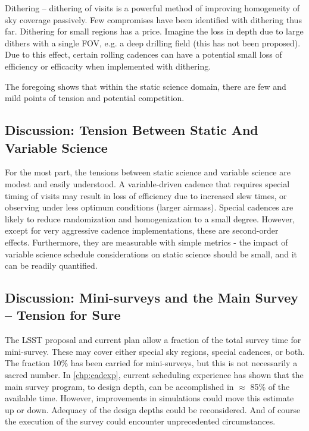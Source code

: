 \begin{description}
\item{Dithering} -- dithering of visits is a powerful method of
improving homogeneity of sky coverage passively. Few compromises have
been identified with dithering thus far.  Dithering for small regions
has a price. Imagine the loss in depth due to large dithers with a
single FOV, e.g. a deep drilling field (this has not been proposed).
Due to this effect, certain rolling cadences can have a potential small
loss of efficiency or efficacity when implemented with dithering.

\end{description}

The foregoing shows that within the static science domain, there are few
and mild points of tension and potential competition.


\subsection{Discussion: Tension Between Static And Variable Science}

For the most part, the tensions between static science and variable
science are modest and easily understood.  A variable-driven cadence
that requires special timing of visits may result in loss of efficiency
due to increased slew times, or observing under less optimum conditions
(larger airmass).  Special cadences are likely to reduce randomization
and homogenization to a small degree. However, except for very
aggressive cadence implementations, these are second-order effects.
Furthermore, they are measurable with simple metrics - the impact of
variable science schedule considerations on static science should be
small, and it can be readily quantified.


\subsection{Discussion: Mini-surveys and the Main Survey -- Tension for Sure}

The LSST proposal and current plan allow a fraction of the total survey
time for mini-survey. These may cover either special sky regions,
special cadences, or both. The fraction 10\% has been carried for
mini-surveys, but this is not necessarily a sacred number. In
\autoref{chp:cadexp}, current scheduling experience has shown that the
main survey program, to design depth, can be accomplished in $\approx$
85\% of the available time. However, improvements in simulations could
move this estimate up or down. Adequacy of the design depths could be
reconsidered.  And of course the execution of the survey could encounter
unprecedented circumstances.


